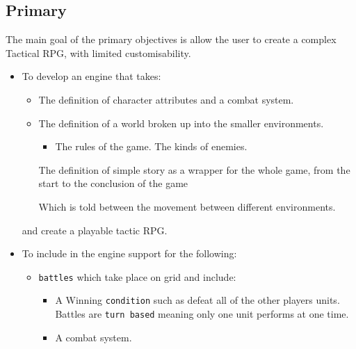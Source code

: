 \subsection{Primary}
\label{primary}
The main goal of the primary objectives is allow the user to create a complex Tactical RPG, with limited customisability.  
\begin{itemize}
\item To develop an engine that takes:
\begin{itemize}

 \item The definition of character attributes and a combat system.
	\item The definition of a world broken up into the smaller environments.
	\begin{itemize}
		\item The rules of the game.
		\cross The kinds of enemies.
	\end{itemize}
	
	\tick The definition of simple story as a wrapper for the whole game, from the start to the conclusion of the game
	\begin{itemize}
		\cross Which is told between the movement between different environments.
	\end{itemize}
	                        
\end{itemize}
and create a playable tactic RPG.

\item To include in the engine support for the following:

\begin{itemize}
	\tick \texttt{units} with a fixed set of associated attributes such as:
	\begin{itemize}
		\tick Hit-points (which represent the health of the unit).
		\tick Strength.
		\tick Defence.
		\tick Move (The number of tiles the unit can move each turn).
	\end{itemize}
	
	\item \texttt{battles} which take place on grid and include:
	\begin{itemize}
		\tick  A set number of \texttt{units} for each player.
		\item  A Winning \texttt{condition} such as defeat all of the other players units.
		\tick  Battles are \texttt{turn based} meaning only one unit performs at one time.   
		\item  A combat system. \marginpar{\textbf{Nearly}}
	\end{itemize}
	

\end{itemize}
\end{itemize}
